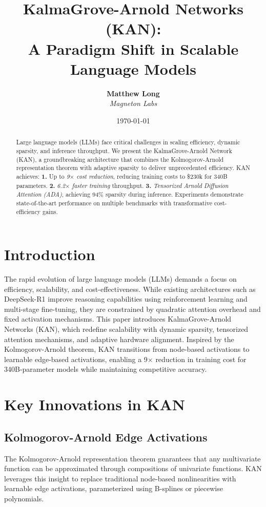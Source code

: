 \documentclass[twocolumn]{article}
\title{KalmaGrove-Arnold Networks (KAN): \\
A Paradigm Shift in Scalable Language Models}
\author{
  \textbf{Matthew Long}\\
  \textit{Magneton Labs}
}
\date{\today}
\begin{document}
\maketitle

\begin{abstract}
Large language models (LLMs) face critical challenges in scaling efficiency, dynamic sparsity, and inference throughput. We present the KalmaGrove-Arnold Network (KAN), a groundbreaking architecture that combines the Kolmogorov-Arnold representation theorem with adaptive sparsity to deliver unprecedented efficiency. KAN achieves:\newline
\textbf{1.} Up to \textit{9$\times$ cost reduction}, reducing training costs to \$230k for 340B parameters.\newline
\textbf{2.} \textit{6.2$\times$ faster training} throughput.\newline
\textbf{3.} \textit{Tensorized Arnold Diffusion Attention (ADA)}, achieving 94\% sparsity during inference.\newline
Experiments demonstrate state-of-the-art performance on multiple benchmarks with transformative cost-efficiency gains.
\end{abstract}

\section{Introduction}
The rapid evolution of large language models (LLMs) demands a focus on efficiency, scalability, and cost-effectiveness. While existing architectures such as DeepSeek-R1 improve reasoning capabilities using reinforcement learning and multi-stage fine-tuning, they are constrained by quadratic attention overhead and fixed activation mechanisms.\newline
This paper introduces KalmaGrove-Arnold Networks (KAN), which redefine scalability with dynamic sparsity, tensorized attention mechanisms, and adaptive hardware alignment. Inspired by the Kolmogorov-Arnold theorem, KAN transitions from node-based activations to learnable edge-based activations, enabling a 9$\times$ reduction in training cost for 340B-parameter models while maintaining competitive accuracy.

\section{Key Innovations in KAN}
\subsection{Kolmogorov-Arnold Edge Activations}
The Kolmogorov-Arnold representation theorem guarantees that any multivariate function can be approximated through compositions of univariate functions. KAN leverages this insight to replace traditional node-based nonlinearities with learnable edge activations, parameterized using B-splines or piecewise polynomials.
\end{document}
